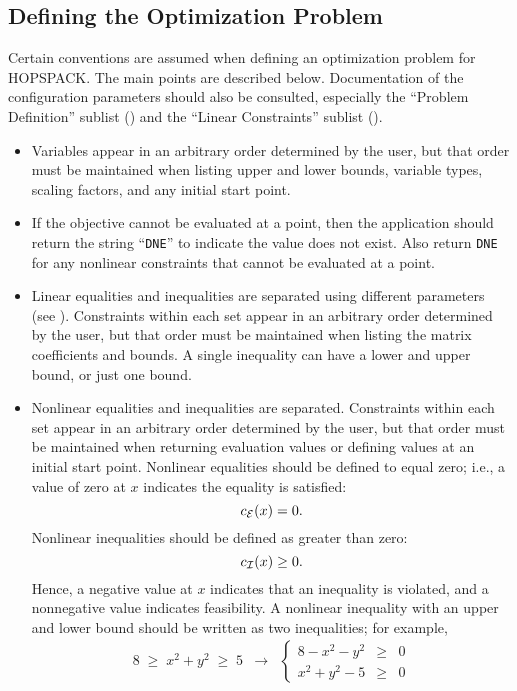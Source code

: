 \subsection{Defining the Optimization Problem}
\label{subconfig:DEFINITION}

Certain conventions are assumed when defining an optimization problem for
HOPSPACK.  The main points are described below.  Documentation of the
configuration parameters should also be consulted, especially the
``Problem Definition'' sublist () and
the ``Linear Constraints'' sublist ().


\begin{itemize}

\item
Variables appear in an arbitrary order determined by the user, but that order
must be maintained when listing upper and lower bounds, variable types,
scaling factors, and any initial start point.

\item
If the objective cannot be evaluated at a point, then the application should
return the string ``{\tt DNE}'' to indicate the value does not exist.
Also return {\tt DNE} for any nonlinear constraints that cannot be evaluated
at a point.

\item
Linear equalities and inequalities are separated using different parameters
(see ).  Constraints within each set
appear in an arbitrary order determined by the user, but that order must be
maintained when listing the matrix coefficients and bounds.  A single inequality
can have a lower and upper bound, or just one bound.

\item
Nonlinear equalities and inequalities are separated.  Constraints within each set
appear in an arbitrary order determined by the user, but that order must be
maintained when returning evaluation values or defining values at an initial
start point.
Nonlinear equalities should be defined to equal zero; i.e., a value of zero
at $x$ indicates the equality is satisfied:
\[
  c_{\cal E}(x) = 0 .
\]
Nonlinear inequalities should be defined as greater than zero:
\[
  c_{\cal I}(x) \geq 0 .
\]
Hence, a negative value at $x$ indicates that an inequality is violated,
and a nonnegative value indicates feasibility.
A nonlinear inequality with an upper and lower bound should be written as
two inequalities; for example,
\[
  \begin{array}{ccc}
     8 \; \geq \; x^2 + y^2 \; \geq \; 5
    & \rightarrow
    & \left\{ \begin{array}{rcl}
                8 - x^2 - y^2 & \geq & 0  \\
                x^2 + y^2 - 5 & \geq & 0
              \end{array}
      \right.
  \end{array}
\]

\end{itemize}


